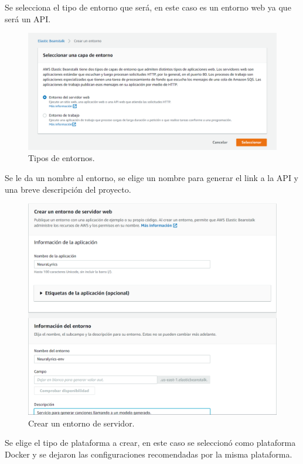 \documentclass[12pt, a4paper, titlepage]{report}
\begin{document}
Se selecciona el tipo de entorno que será, en este caso es un entorno web ya que será un API.
\begin{figure}[H]
	\includegraphics[width=12cm]{./imagenes/Desarrollo/BackEnd/paso_1.png}
	\centering 
	\caption{Tipos de entornos.}
\end{figure}
Se le da un nombre al entorno, se elige un nombre para generar el link a la API y una breve descripción del proyecto.
\begin{figure}[H]
	\includegraphics[width=12cm]{./imagenes/Desarrollo/BackEnd/paso_2.png}
	\centering 
	\caption{Crear un entorno de servidor.}
\end{figure}
Se elige el tipo de plataforma a crear, en este caso se seleccionó como plataforma Docker y se dejaron las configuraciones recomendadas por la misma plataforma.
\end{document}
